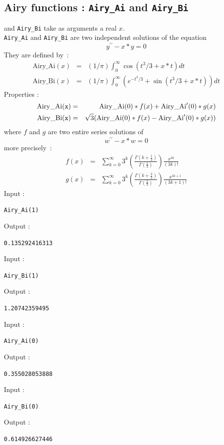 \documentclass[a4paper,11pt]{book}
\begin{document}
\subsection{Airy functions : {\tt Airy\_Ai} and {\tt Airy\_Bi}}
 and {\tt Airy\_Bi} take as arguments a real $x$.\\
{\tt Airy\_Ai} and {\tt Airy\_Bi} are two independent solutions
of the equation
\[ y^{\prime\prime}-x*y=0 \]
They are defined by~:
\begin{eqnarray*}
\mbox{Airy\_Ai}(x) &=& (1/\pi) \int_0^\infty \cos(t^3/3 + x*t) dt \\
\mbox{Airy\_Bi}(x) &=& (1/\pi) \int_0^\infty (e^{- t^3/3} + \sin( t^3/3 +
x*t)) dt
\end{eqnarray*}
Properties :\\
\begin{eqnarray*}
 \tt \mbox{Airy\_Ai}(x)&=&\mbox{Airy\_Ai}(0)*f(x)+
\mbox{Airy\_Ai}^\prime (0)*g(x) \\
\tt \mbox{Airy\_Bi}(x)&=&\sqrt{3}(\mbox{Airy\_Ai}(0)*f(x)
-\mbox{Airy\_Ai}^\prime (0)*g(x) )
\end{eqnarray*}
where $f$ and $g$ are two entire series solutions of  
\[ w^{\prime\prime}-x*w=0 \]
more precisely~:
\begin{eqnarray*}
f(x)&=&\sum_{k=0}^\infty 3^k\left (\frac{\Gamma(k+\frac{1}{3})}{\Gamma(\frac{1}{3})}\right ) \frac{x^{3k}}{(3k)!}\\
g(x)&=&\sum_{k=0}^\infty 3^k\left
  (\frac{\Gamma(k+\frac{2}{3})}{\Gamma(\frac{2}{3})}\right )
\frac{x^{3k+1}}{(3k+1)!}
\end{eqnarray*}
Input :
\begin{center}{\tt Airy\_Ai(1)}\end{center}
Output :
\begin{center}{\tt 0.135292416313}\end{center}
Input :
\begin{center}{\tt Airy\_Bi(1)}\end{center}
Output :
\begin{center}{\tt 1.20742359495}\end{center}
Input :
\begin{center}{\tt Airy\_Ai(0)}\end{center}
Output :
\begin{center}{\tt 0.355028053888}\end{center}
Input :
\begin{center}{\tt Airy\_Bi(0)}\end{center}
Output :
\begin{center}{\tt 0.614926627446}\end{center}
\end{document}
